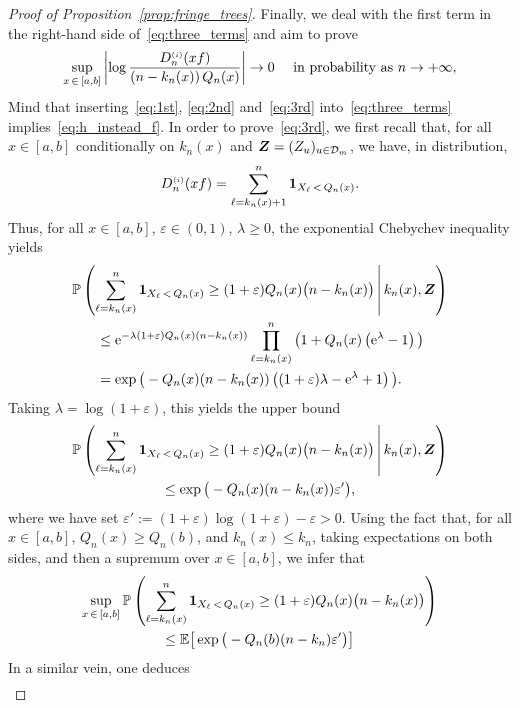 \documentclass[AHL,Unicode,longabstracts,published]{cedram}
\newcommand{\bs}{\ensuremath{\boldsymbol}}
\newcommand{\sss}{\ensuremath{\scriptscriptstyle}}
\newcommand{\bbP}{\mathbb{P}}
\newcommand{\bbE}{\mathbb{E}}
\newcommand{\clD}{\mathcal{D}}
\newcommand{\rme}{\mathrm{e}}
\begin{document}
\begin{proof}[Proof of Proposition~\ref{prop:fringe_trees}]
Finally, we deal with the first term in the right-hand side of~\eqref{eq:three_terms} and aim to prove
\begin{equation}\label{eq:3rd}
\sup_{x\,\in\,[a,b]}\left|\log \frac{D_n^{\sss (i)}(xf)}{\left(n-k_n(x)\right)Q_n(x)}\right| \to 0\quad\text{ in probability as }n\to+\infty,
\end{equation}
Mind that inserting~\eqref{eq:1st}, \eqref{eq:2nd} and~\eqref{eq:3rd} into~\eqref{eq:three_terms} implies~\eqref{eq:h_instead_f}. In order to prove~\eqref{eq:3rd}, we first recall that, for all $x\in[a,b]$ conditionally on $k_n(x)$ and $\bs Z = (Z_u)_{u\in\clD_m}$, we have, in distribution,
\[
D_n^{\sss (i)}(xf) = \sum_{\ell=k_n(x)+1}^n \bs1_{X_\ell\,<\,Q_n(x)}.
\]
Thus, for all $x\in [a,b]$, $\varepsilon\in(0,1)$, $\lambda\geq 0$, the exponential Chebychev inequality yields
\begin{multline*}
\bbP\left(\sum_{\ell=k_n(x)}^n \bs1_{X_\ell\,< \,Q_n(x)}\geq (1+\varepsilon)Q_n(x)\big(n-k_n(x)\big)\,\middle|\, k_n(x), \bs Z\right)\\
\begin{aligned}
&\leq \rme^{-\lambda(1+\varepsilon)Q_n(x)(n-k_n(x))}
\prod_{\ell=k_n(x)}^n\big(1+Q_n(x)\left(\rme^\lambda-1\right)\big)\\
&= \exp\big(-Q_n(x)(n-k_n(x))\left((1+\varepsilon) \lambda -\rme^{\lambda}+1\right)\big).
\end{aligned}
\end{multline*}
Taking $\lambda = \log(1+\varepsilon)$, this yields the upper bound
\begin{multline*}
\bbP\left(\sum_{\ell=k_n(x)}^n \bs1_{X_\ell\,<\,Q_n(x)}\geq (1+\varepsilon)Q_n(x)\big(n-k_n(x)\big)\,\middle|\, k_n(x), \bs Z\right)\\
\leq\exp\big(-Q_n(x)(n-k_n(x))\varepsilon'\big),
\end{multline*}
where we have set $\varepsilon':=(1+\varepsilon)\log(1+\varepsilon) - \varepsilon>0$. Using the fact that, for all $x\in[a,b]$, $Q_n(x)\geq Q_n(b)$, and $k_n(x)\leq k_n$, taking expectations on both sides, and then a supremum over $x\in[a,b]$, we infer that
\begin{multline*}
\sup_{x\,\in\,[a,b]}
\bbP\left(\sum_{\ell=k_n(x)}^n \bs1_{X_\ell\,< \,Q_n(x)}\geq (1+\varepsilon)Q_n(x)\big(n-k_n(x)\big)\right) \\
\leq\bbE\big[\exp\big(-Q_n(b)(n-k_n)\varepsilon'\big)\big]
\end{multline*}
In a similar vein, one deduces
\begin{multline*}

\end{multline*}
\end{proof}
\end{document}
